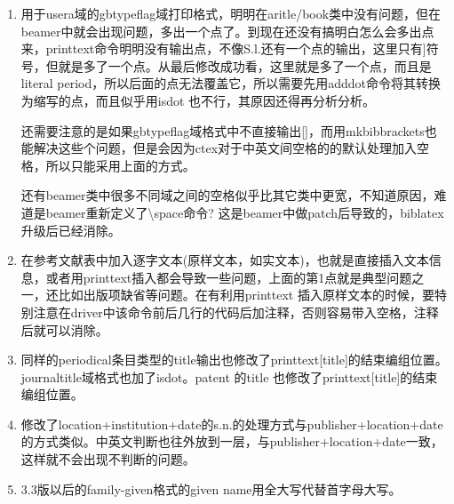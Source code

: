 \begin{enumerate}
\item 用于usera域的gbtypeflag域打印格式，明明在aritle/book类中没有问题，但在beamer中就会出现问题，多出一个点了。到现在还没有搞明白怎么会多出点来，printtext命令明明没有输出点，不像S.l.还有一个点的输出，这里只有]符号，但就是多了一个点。从最后修改成功看，这里就是多了一个点，而且是literal period，所以后面的点无法覆盖它，所以需要先用adddot命令将其转换为缩写的点，而且似乎用isdot 也不行，其原因还得再分析分析。

还需要注意的是如果gbtypeflag域格式中不直接输出[]，而用mkbibbrackets也能解决这些个问题，但是会因为ctex对于中英文间空格的的默认处理加入空格，所以只能采用上面的方式。

还有beamer类中很多不同域之间的空格似乎比其它类中更宽，不知道原因，难道是beamer重新定义了\textbackslash space命令? 这是beamer中做patch后导致的，biblatex升级后已经消除。

\item 在参考文献表中加入逐字文本(原样文本，如实文本)，也就是直接插入文本信息，或者用printtext插入都会导致一些问题，上面的第1点就是典型问题之一，还比如出版项缺省等问题。在有利用printtext 插入原样文本的时候，要特别注意在driver中该命令前后几行的代码后加注释，否则容易带入空格，注释后就可以消除。

\item 同样的periodical条目类型的title输出也修改了printtext[title]的结束编组位置。journaltitle域格式也加了isdot。patent 的title 也修改了printtext[title]的结束编组位置。

\item 修改了location+institution+date的s.n.的处理方式与publisher+location+date的方式类似。中英文判断也往外放到一层，与publisher+location+date一致，这样就不会出现不判断的问题。

\item 3.3版以后的family-given格式的given name用全大写代替首字母大写。
\end{enumerate}



